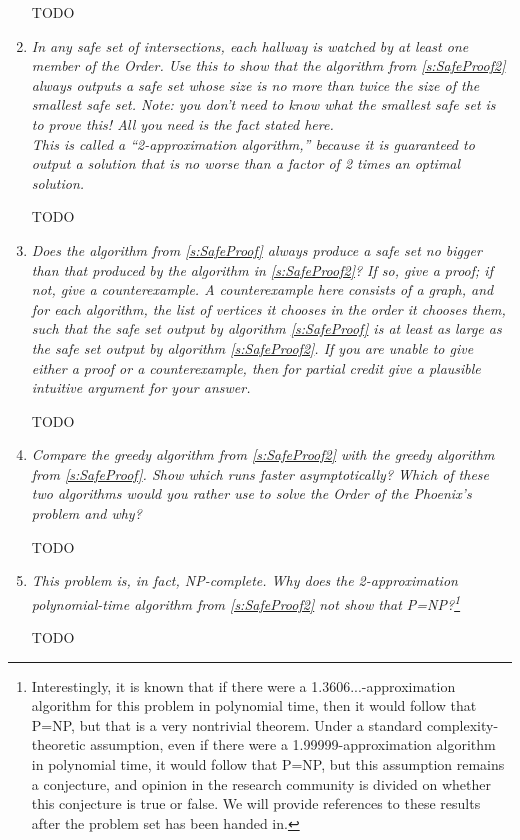 \documentclass[12pt]{article} \setlength{\oddsidemargin}{0in}
\begin{document}
\begin{enumerate}
TODO

\item\textit{In any safe set of intersections, each hallway is watched by at least one member of the Order. Use this to show that the algorithm from \ref{s:SafeProof2} always outputs a safe set whose size is no more than twice the size of the smallest safe set. Note: you don't need to know what the smallest safe set is to prove this! All you need is the fact stated here.\\
This is called a ``2-approximation algorithm,'' because it is guaranteed to output a solution that is no worse than a factor of 2 times an optimal solution.}

TODO

\item\textit{Does the algorithm from \ref{s:SafeProof} always produce a safe set no bigger than that produced by the algorithm in \ref{s:SafeProof2}? If so, give a proof; if not, give a counterexample. A counterexample here consists of a graph, and for each algorithm, the list of vertices it chooses in the order it chooses them, such that the safe set output by algorithm \ref{s:SafeProof} is at least as large as the safe set output by algorithm \ref{s:SafeProof2}. If you are unable to give either a proof or a counterexample, then for partial credit give a plausible intuitive argument for your answer.}

TODO

\item\textit{Compare the greedy algorithm from \ref{s:SafeProof2} with the greedy algorithm from \ref{s:SafeProof}. Show which runs faster asymptotically? Which of these two algorithms would you rather use to solve the Order of the Phoenix's problem and why?}

TODO

\item\textit{This problem is, in fact, NP-complete. Why does the 2-approximation polynomial-time algorithm from \ref{s:SafeProof2} not show that P=NP?\footnote{Interestingly, it is known that if there were a 1.3606...-approximation algorithm for this problem in polynomial time, then it would follow that P=NP, but that is a very nontrivial theorem. Under a standard complexity-theoretic assumption, even if there were a 1.99999-approximation algorithm in polynomial time, it would follow that P=NP, but this assumption remains a conjecture, and opinion in the research community is divided on whether this conjecture is true or false. We will provide references to these results after the problem set has been handed in.}}

TODO

\end{enumerate}
\end{document}
